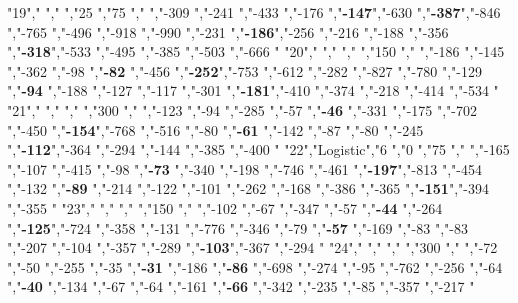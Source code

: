 "19","        ","     ","25  ","75  ","     ","-309          ","-241          ","-433          ","-176          ","\textbf{-147}","-630          ","\textbf{-387}","-846          ","-765          ","-496          ","-918          ","-990          ","-231          ","\textbf{-186}","-256          ","-216          ","-188          ","-356          ","\textbf{-318}","-533          ","-495          ","-385          ","-503          ","-666          "
"20","        ","     ","    ","150 ","     ","-186          ","-145          ","-362          ","-98           ","\textbf{-82} ","-456          ","\textbf{-252}","-753          ","-612          ","-282          ","-827          ","-780          ","-129          ","\textbf{-94} ","-188          ","-127          ","-117          ","-301          ","\textbf{-181}","-410          ","-374          ","-218          ","-414          ","-534          "
"21","        ","     ","    ","300 ","     ","-123          ","-94           ","-285          ","-57           ","\textbf{-46} ","-331          ","-175          ","-702          ","-450          ","\textbf{-154}","-768          ","-516          ","-80           ","\textbf{-61} ","-142          ","-87           ","-80           ","-245          ","\textbf{-112}","-364          ","-294          ","-144          ","-385          ","-400          "
"22","Logistic","6    ","0   ","75  ","     ","-165          ","-107          ","-415          ","-98           ","\textbf{-73} ","-340          ","-198          ","-746          ","-461          ","\textbf{-197}","-813          ","-454          ","-132          ","\textbf{-89} ","-214          ","-122          ","-101          ","-262          ","-168          ","-386          ","-365          ","\textbf{-151}","-394          ","-355          "
"23","        ","     ","    ","150 ","     ","-102          ","-67           ","-347          ","-57           ","\textbf{-44} ","-264          ","\textbf{-125}","-724          ","-358          ","-131          ","-776          ","-346          ","-79           ","\textbf{-57} ","-169          ","-83           ","-83           ","-207          ","-104          ","-357          ","-289          ","\textbf{-103}","-367          ","-294          "
"24","        ","     ","    ","300 ","     ","-72           ","-50           ","-255          ","-35           ","\textbf{-31} ","-186          ","\textbf{-86} ","-698          ","-274          ","-95           ","-762          ","-256          ","-64           ","\textbf{-40} ","-134          ","-67           ","-64           ","-161          ","\textbf{-66} ","-342          ","-235          ","-85           ","-357          ","-217          "
